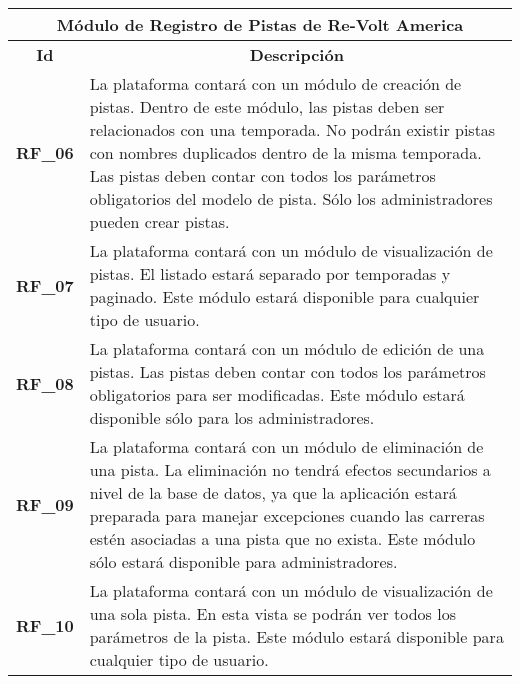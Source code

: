 \begin{center}
	\begin{tabular}{ | l | p{15cm} |}
		\hline
		\multicolumn{2}{|c|}{\textbf{Módulo de Registro de Pistas de Re-Volt America}} \\
		\hline
		\multicolumn{1}{|c|}{\textbf{Id}} & \multicolumn{1}{|c|}{\textbf{Descripción}} \\
		\hline
		{\textbf{RF\_06}} & La plataforma contará con un módulo de creación de pistas. Dentro de este módulo, las pistas deben ser relacionados con una temporada. No podrán existir pistas con nombres duplicados dentro de la misma temporada. Las pistas deben contar con todos los parámetros obligatorios del modelo de pista. Sólo los administradores pueden crear pistas. \\ \hline
		
		{\textbf{RF\_07}} & La plataforma contará con un módulo de visualización de pistas. El listado estará separado por temporadas y paginado. Este módulo estará disponible para cualquier tipo de usuario. \\ \hline
		
		{\textbf{RF\_08}} & La plataforma contará con un módulo de edición de una pistas. Las pistas deben contar con todos los parámetros obligatorios para ser modificadas. Este módulo estará disponible sólo para los administradores. \\ \hline
		
		{\textbf{RF\_09}} & La plataforma contará con un módulo de eliminación de una pista. La eliminación no tendrá efectos secundarios a nivel de la base de datos, ya que la aplicación estará preparada para manejar excepciones cuando las carreras estén asociadas a una pista que no exista. Este módulo sólo estará disponible para administradores. \\ \hline
		
		{\textbf{RF\_10}} & La plataforma contará con un módulo de visualización de una sola pista. En esta vista se podrán ver todos los parámetros de la pista. Este módulo estará disponible para cualquier tipo de usuario. \\ \hline
	\end{tabular}
  
  \label{table:rf:tracks}
\end{center}

